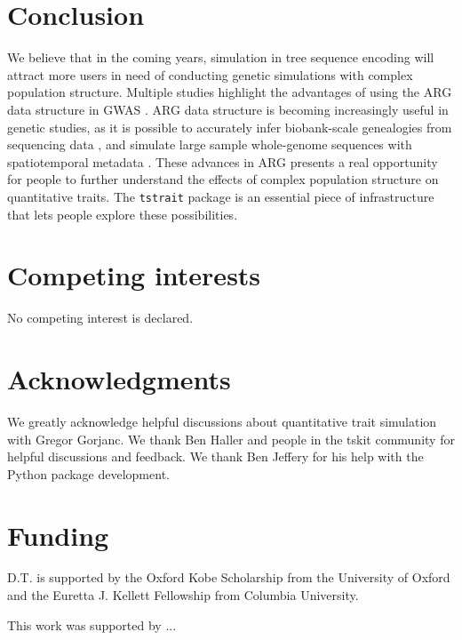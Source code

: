 \documentclass[unnumsec,webpdf,modern,large,namedate]{oup-authoring-template}%
\begin{document}
\section{Conclusion}

We believe that in the coming years, simulation in tree sequence encoding will
attract more users in need of conducting genetic simulations with complex
population structure. Multiple studies highlight the advantages of using the
ARG data structure in GWAS \citep{link2023tree,nowbandegani2023extremely,zhang2023}.
ARG data
structure is becoming increasingly useful in genetic studies, as it is possible
to accurately infer biobank-scale genealogies from sequencing data
\citep{zhang2023}, and simulate large sample whole-genome sequences with
spatiotemporal metadata \citep{anderson2023}. These advances in ARG presents a
real opportunity for people to further understand the effects of complex
population structure on quantitative traits. The \texttt{tstrait} package is an
essential piece of infrastructure that lets people explore these possibilities.

\section{Competing interests}
No competing interest is declared.

\section{Acknowledgments}

We greatly acknowledge helpful discussions about quantitative trait simulation
with Gregor Gorjanc. We thank Ben Haller and people in the tskit community for
helpful discussions and feedback. We thank Ben Jeffery for his help with the
Python package development.

\section{Funding}

D.T. is supported by the Oxford Kobe Scholarship from the University of Oxford
and the Euretta J. Kellett Fellowship from Columbia University.

This work was supported by ...




\end{document}
